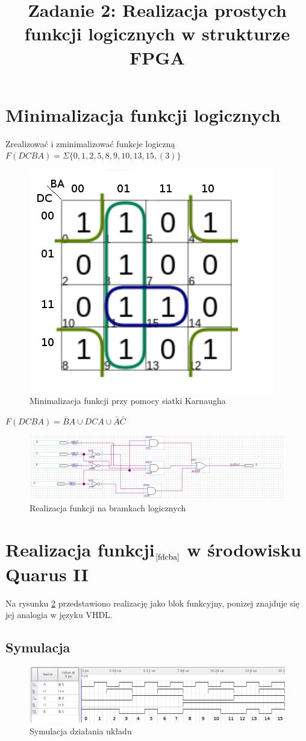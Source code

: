 \documentclass{classrep}
\author{
  \studentinfo{Witold Olechowski}{127517} \and
  \studentinfo{Tomasz Marecik}{127374}
}
\title{Zadanie 2: Realizacja prostych funkcji logicznych w strukturze FPGA}
\begin{document}
\maketitle

\section{Minimalizacja funkcji logicznych}
Zrealizować i zminimalizować funkcje logiczną 
$F(DCBA)= \varSigma \{0,1,2,5,8,9,10,13,15,(3)\} \label{fdcba}$

\begin{figure}[H]
	\centering
	\includegraphics[width=0.4\linewidth]{kar}
	\caption{Minimalizacja funkcji przy pomocy siatki Karnaugha}
	\label{fig:kar}
\end{figure}

$F(DCBA)=\bar{B} A \cup DCA \cup \bar{A} \bar{C}$

\begin{figure}
	\centering
	\includegraphics[width=1.0\linewidth]{block}
	\caption{Realizacja funkcji na bramkach logicznych}
	\label{fig:block}
\end{figure}

\section{Realizacja funkcji$_{\ref{fdcba}}$ w środowisku Quarus II}
Na rysunku \ref{fig:block} przedstawiono realizację jako blok funkcyjny, ponizej znajduje się jej analogia w języku VHDL.



\subsection{Symulacja}
 \begin{figure}[H]
\centering
\includegraphics[width=1.0\linewidth]{symf}
\caption{Symulacja działania układu}
\label{fig:symf}
\end{figure}
\end{document}
